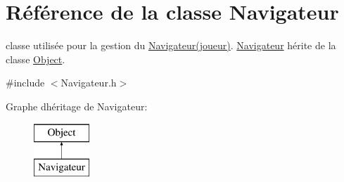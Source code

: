 \hypertarget{class_navigateur}{}\section{Référence de la classe Navigateur}
\label{class_navigateur}


classe utilisée pour la gestion du \hyperlink{class_navigateur}{Navigateur(joueur)}. \hyperlink{class_navigateur}{Navigateur} hérite de la classe \hyperlink{class_object}{Object}.  




{\ttfamily \#include $<$Navigateur.\+h$>$}

Graphe d\textquotesingle{}héritage de Navigateur\+:\begin{figure}[H]
\begin{center}
\leavevmode
\includegraphics[height=2.000000cm]{class_navigateur}
\end{center}
\end{figure}
